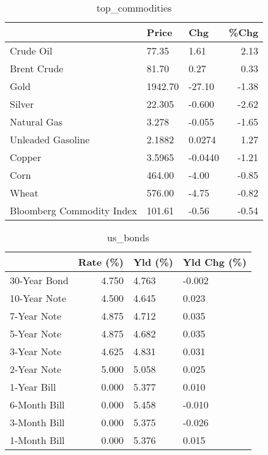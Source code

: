 \documentclass{article}%
\begin{document}
\begin{table}[htbp]%
\caption{top\_commodities}%
\centering%
\begin{adjustbox}{width=1\textwidth}%
\begin{tabular}{lllr}
\toprule
                          &   Price &     Chg &  \%Chg \\
\midrule
               Crude Oil  &   77.35 &    1.61 &  2.13 \\
             Brent Crude  &   81.70 &    0.27 &  0.33 \\
                    Gold  & 1942.70 &  -27.10 & -1.38 \\
                  Silver  &  22.305 &  -0.600 & -2.62 \\
             Natural Gas  &   3.278 &  -0.055 & -1.65 \\
       Unleaded Gasoline  &  2.1882 &  0.0274 &  1.27 \\
                  Copper  &  3.5965 & -0.0440 & -1.21 \\
                    Corn  &  464.00 &   -4.00 & -0.85 \\
                   Wheat  &  576.00 &   -4.75 & -0.82 \\
Bloomberg Commodity Index &  101.61 &   -0.56 & -0.54 \\
\bottomrule
\end{tabular}
%
\end{adjustbox}%
\end{table}

%


\begin{table}[htbp]%
\caption{us\_bonds}%
\centering%
\begin{adjustbox}{width=1\textwidth}%
\begin{tabular}{lrll}
\toprule
             &  Rate (\%) & Yld (\%) & Yld Chg (\%) \\
\midrule
30-Year Bond &     4.750 &   4.763 &      -0.002 \\
10-Year Note &     4.500 &   4.645 &       0.023 \\
 7-Year Note &     4.875 &   4.712 &       0.035 \\
 5-Year Note &     4.875 &   4.682 &       0.035 \\
 3-Year Note &     4.625 &   4.831 &       0.031 \\
 2-Year Note &     5.000 &   5.058 &       0.025 \\
 1-Year Bill &     0.000 &   5.377 &       0.010 \\
6-Month Bill &     0.000 &   5.458 &      -0.010 \\
3-Month Bill &     0.000 &   5.375 &      -0.026 \\
1-Month Bill &     0.000 &   5.376 &       0.015 \\
\bottomrule
\end{tabular}
%
\end{adjustbox}%
\end{table}
\end{document}
